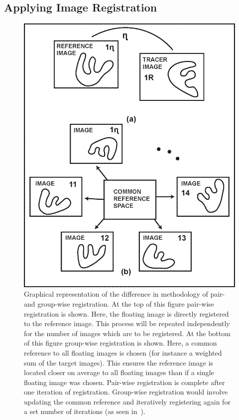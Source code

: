         \subsection{Applying Image Registration} \label{sec:applying_image_registration}
            \begin{figure}
                \centering
                        
                \includegraphics[width=0.9\linewidth]{figures/background_applying_image_registration_pairwise_groupwise_comparison.png}
                        
                \captionsetup{singlelinecheck=false}
                \caption{
                    Graphical representation of the difference in methodology of pair- and group-wise registration. At the top of this figure pair-wise registration is shown. Here, the floating image is directly registered to the reference image. This process will be repeated independently for the number of images which are to be registered. At the bottom of this figure group-wise registration is shown. Here, a common reference to all floating images is chosen (for instance a weighted sum of the target images). This ensures the reference image is located closer on average to all floating images than if a single floating image was chosen. Pair-wise registration is complete after one iteration of registration. Group-wise registration would involve updating the common reference and iteratively registering again for a set number of iterations (as seen in~).
                    }
                    \label{fig:applying_image_registration_pair-wise_group-wise_comparison}
            \end{figure}
            
